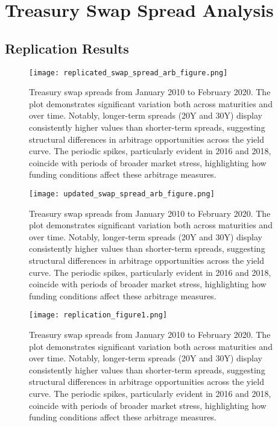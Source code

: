 \documentclass[12pt]{article}
\begin{document}
\section{Treasury Swap Spread Analysis}

\subsection{Replication Results}

\begin{figure}[H]
    \centering
    \texttt{[image: replicated\_swap\_spread\_arb\_figure.png]}
    \caption{Treasury swap spreads from January 2010 to February 2020. The plot demonstrates significant variation both across maturities and over time. Notably, longer-term spreads (20Y and 30Y) display consistently higher values than shorter-term spreads, suggesting structural differences in arbitrage opportunities across the yield curve. The periodic spikes, particularly evident in 2016 and 2018, coincide with periods of broader market stress, highlighting how funding conditions affect these arbitrage measures.}
    \label{fig:treasury_swap_spreads_replicated}
\end{figure}

\begin{figure}[H]
    \centering
    \texttt{[image: updated\_swap\_spread\_arb\_figure.png]}
    \caption{Treasury swap spreads from January 2010 to February 2020. The plot demonstrates significant variation both across maturities and over time. Notably, longer-term spreads (20Y and 30Y) display consistently higher values than shorter-term spreads, suggesting structural differences in arbitrage opportunities across the yield curve. The periodic spikes, particularly evident in 2016 and 2018, coincide with periods of broader market stress, highlighting how funding conditions affect these arbitrage measures.}
    \label{fig:treasury_swap_spreads_updated}
\end{figure}

\begin{figure}[H]
    \centering
    \texttt{[image: replication\_figure1.png]}
    \caption{Treasury swap spreads from January 2010 to February 2020. The plot demonstrates significant variation both across maturities and over time. Notably, longer-term spreads (20Y and 30Y) display consistently higher values than shorter-term spreads, suggesting structural differences in arbitrage opportunities across the yield curve. The periodic spikes, particularly evident in 2016 and 2018, coincide with periods of broader market stress, highlighting how funding conditions affect these arbitrage measures.}
    \label{fig:treasury_swap_spreads_supplementary1}
\end{figure}
\end{document}
